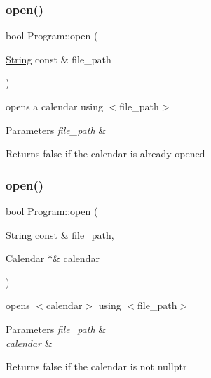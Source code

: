 \subsubsection{\texorpdfstring{open()}{open()}\hspace{0.1cm}{\footnotesize\ttfamily [1/2]}}
{\footnotesize\ttfamily bool Program\+::open (\begin{DoxyParamCaption}\item[{\hyperlink{classString}{String} const \&}]{file\+\_\+path }\end{DoxyParamCaption})}

opens a calendar using $<$file\+\_\+path$>$ 
\begin{DoxyParams}{Parameters}
{\em file\+\_\+path} & \\
\hline
\end{DoxyParams}
\begin{DoxyReturn}{Returns}
false if the calendar is already opened 
\end{DoxyReturn}
\mbox{\label{classProgram_ad12fa0703d93dbec2b2badc96ab97cf6}} 
\subsubsection{\texorpdfstring{open()}{open()}\hspace{0.1cm}{\footnotesize\ttfamily [2/2]}}
{\footnotesize\ttfamily bool Program\+::open (\begin{DoxyParamCaption}\item[{\hyperlink{classString}{String} const \&}]{file\+\_\+path,  }\item[{\hyperlink{classCalendar}{Calendar} $\ast$\&}]{calendar }\end{DoxyParamCaption})\hspace{0.3cm}{\ttfamily [static]}}

opens $<$calendar$>$ using $<$file\+\_\+path$>$ 
\begin{DoxyParams}{Parameters}
{\em file\+\_\+path} & \\
\hline
{\em calendar} & \\
\hline
\end{DoxyParams}
\begin{DoxyReturn}{Returns}
false if the calendar is not nullptr 
\end{DoxyReturn}
\mbox{\label{classProgram_a2f494b9e0a50657ac89a61a96e92face}} 

